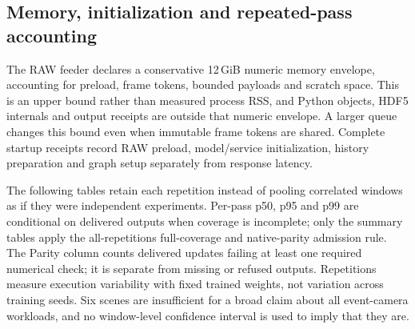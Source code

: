 \subsection{Memory, initialization and repeated-pass accounting}

\begin{table}[H]
\centering\small
\caption{\textbf{All attempts and service allocation.} CUDA peaks include resident model, persistent state, graph buffers and stream allocations after the counter reset. Values are allocated MiB, not the allocator's additional reserved capacity.}

\end{table}

The RAW feeder declares a conservative 12\,GiB numeric memory envelope, accounting for preload, frame tokens, bounded payloads and scratch space. This is an upper bound rather than measured process RSS, and Python objects, HDF5 internals and output receipts are outside that numeric envelope. A larger queue changes this bound even when immutable frame tokens are shared. Complete startup receipts record RAW preload, model/service initialization, history preparation and graph setup separately from response latency.

\begin{table}[H]
\centering\footnotesize
\caption{\textbf{Initialization and reuse diagnostics.} Preload and model/priming columns give medians across the declared scenes and repetitions, in seconds. Model/priming excludes source audits, RAW history initialization and the fixed rest. Garl graph capture is recorded separately. Cache hits are conditional on attempted model updates, not new sensor frames; reserved MiB is the PyTorch allocator's peak reserve.}

\end{table}

The following tables retain each repetition instead of pooling correlated windows as if they were independent experiments. Per-pass p50, p95 and p99 are conditional on delivered outputs when coverage is incomplete; only the summary tables apply the all-repetitions full-coverage and native-parity admission rule. The Parity column counts delivered updates failing at least one required numerical check; it is separate from missing or refused outputs. Repetitions measure execution variability with fixed trained weights, not variation across training seeds. Six scenes are insufficient for a broad claim about all event-camera workloads, and no window-level confidence interval is used to imply that they are.

